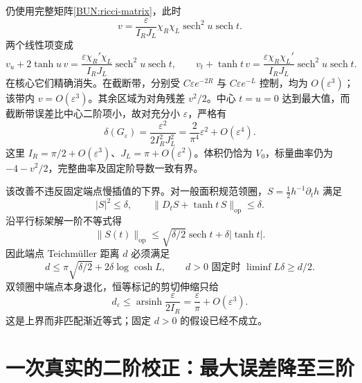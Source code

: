 \documentclass[UTF8,fontset=fandol,zihao=-4,oneside,openany]{ctexbook}
\theoremstyle{cjkplain}
\numberwithin{equation}{chapter}
\begin{document}
仍使用完整矩阵\eqref{BUN:ricci-matrix}，此时
\[
 v=\frac{\varepsilon}{I_RJ_L}\chi_R\chi_L
 \operatorname{sech}^2u\operatorname{sech}t.
\]
两个线性项变成
\begin{equation}
 v_u+2\tanh u\,v=
 \frac{\varepsilon\chi_R'\chi_L}{I_RJ_L}\operatorname{sech}^2u\operatorname{sech}t,
 \qquad
 v_t+\tanh t\,v=
 \frac{\varepsilon\chi_R\chi_L'}{I_RJ_L}\operatorname{sech}^2u\operatorname{sech}t.
 \label{BUN:cancellation}
\end{equation}
在核心它们精确消失。在截断带，分别受 $C\varepsilon e^{-2R}$ 与 $C\varepsilon e^{-L}$ 控制，均为 $O(\varepsilon^3)$；该带内 $v=O(\varepsilon^3)$。其余区域为对角残差 $v^2/2$。中心 $t=u=0$ 达到最大值，而截断带误差比中心二阶项小，故对充分小 $\varepsilon$，严格有
\begin{equation}
 \boxed{\delta(G_\varepsilon)=\frac{\varepsilon^2}{2I_R^2J_L^2}
 =\frac{2}{\pi^4}\varepsilon^2+O(\varepsilon^4).}
 \label{BUN:exact-second}
\end{equation}
这里 $I_R=\pi/2+O(\varepsilon^3)$、$J_L=\pi+O(\varepsilon^2)$。体积仍恰为 $V_0$，标量曲率仍为 $-4-v^2/2$，完整曲率及固定阶导数一致有界。

该改善不违反固定端点慢插值的下界。对一般面积规范领圈，$S=\frac12h^{-1}\partial_th$ 满足
\[
 |S|^2\le\delta,\qquad
 \|D_tS+\tanh t\,S\|_{\mathrm{op}}\le\delta.
\]
沿平行标架解一阶不等式得
\[
 \|S(t)\|_{\mathrm{op}}\le\sqrt{\delta/2}\operatorname{sech}t
 +\delta|\tanh t|.
\]
因此端点 Teichmüller 距离 $d$ 必须满足
\begin{equation}
 d\le\pi\sqrt{\delta/2}+2\delta\log\cosh L,
 \qquad d>0\text{ 固定时 }\liminf L\delta\ge d/2.
 \label{BUN:fixed-endpoint}
\end{equation}
双领圈中端点本身退化，恒等标记的剪切伸缩只给
\[
 d_\varepsilon\le\operatorname{arsinh}\frac{\varepsilon}{2I_R}
 =\frac{\varepsilon}{\pi}+O(\varepsilon^3).
\]
这是上界而非匹配渐近等式；固定 $d>0$ 的假设已经不成立。

\section{一次真实的二阶校正：最大误差降至三阶}
\label{BUN:third}
\end{document}
